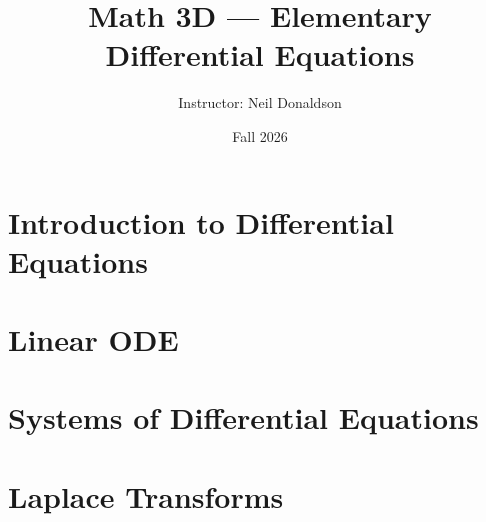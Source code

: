 \documentclass[11pt]{article}
\title{Math 3D --- Elementary Differential Equations}
\author{Instructor: Neil Donaldson}
\date{Fall 2026}
\begin{document}
\maketitle
\tableofcontents
\newpage

\section{Introduction to Differential Equations}


\section{Linear ODE}


\newpage
\section{Systems of Differential Equations}


\newpage
\setcounter{section}{5}
\section{Laplace Transforms}

\end{document}
